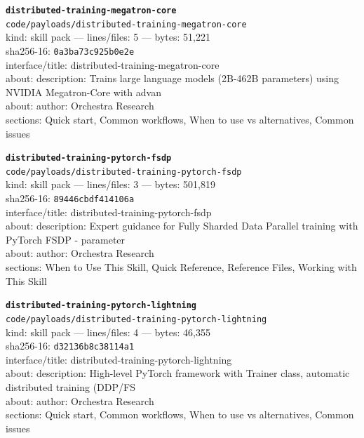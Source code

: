 \noindent\textbf{\texttt{distributed-training-megatron-core}}\\
\texttt{code/payloads/distributed-training-megatron-core}\\
kind: skill pack --- lines/files: 5 --- bytes: 51,221\\
sha256-16: \texttt{0a3ba73c925b0e2e}\\
interface/title: distributed-training-megatron-core\\
about: description: Trains large language models (2B-462B parameters) using NVIDIA Megatron-Core with advan\\
about: author: Orchestra Research\\
sections: Quick start, Common workflows, When to use vs alternatives, Common issues\\
\vspace*{6.0pt}
\newpage

\noindent\textbf{\texttt{distributed-training-pytorch-fsdp}}\\
\texttt{code/payloads/distributed-training-pytorch-fsdp}\\
kind: skill pack --- lines/files: 3 --- bytes: 501,819\\
sha256-16: \texttt{89446cbdf414106a}\\
interface/title: distributed-training-pytorch-fsdp\\
about: description: Expert guidance for Fully Sharded Data Parallel training with PyTorch FSDP - parameter \\
about: author: Orchestra Research\\
sections: When to Use This Skill, Quick Reference, Reference Files, Working with This Skill\\
\vspace*{6.0pt}

\noindent\textbf{\texttt{distributed-training-pytorch-lightning}}\\
\texttt{code/payloads/distributed-training-pytorch-lightning}\\
kind: skill pack --- lines/files: 4 --- bytes: 46,355\\
sha256-16: \texttt{d32136b8c38114a1}\\
interface/title: distributed-training-pytorch-lightning\\
about: description: High-level PyTorch framework with Trainer class, automatic distributed training (DDP/FS\\
about: author: Orchestra Research\\
sections: Quick start, Common workflows, When to use vs alternatives, Common issues\\
\vspace*{6.0pt}

